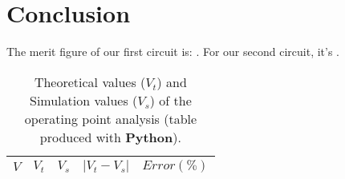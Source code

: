 \section{Conclusion}
\label{sec:conclusion}


The merit figure of our first circuit is: . For our second circuit, it's .


\begin{table}[H]
  \centering
  \begin{tabular}{|c|c|c|c|c|}
    \hline
        $V$ & $V_t$ & $V_s$ & $|V_t-V_s|$ & $Error (\%)$ \\
        \hline
        \hline
        
        \hline
  \end{tabular}
  \caption{Theoretical values ($V_t$) and Simulation values ($V_s$) of the operating point analysis (table produced with {\bf Python}).}
  \label{error1_res}
\end{table}

